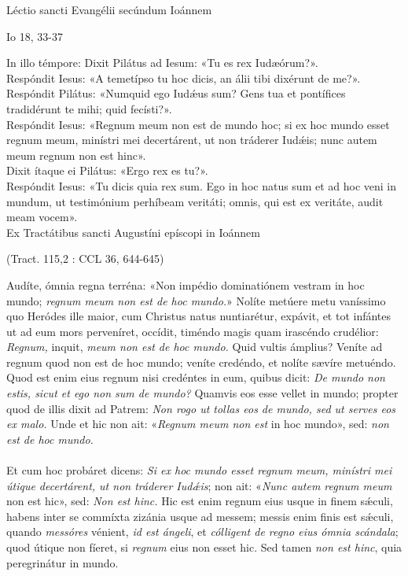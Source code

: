 \documentclass[options]{article}
\begin{document}
			Léctio sancti Evangélii secúndum Ioánnem 
		\begin{flushright}
			Io 18, 33-37 
		\end{flushright} 
	In illo témpore:
	Dixit Pilátus ad Iesum: «Tu es rex Iudæórum?».\\
	Respóndit Iesus: «A temetípso tu hoc dicis, an álii tibi dixérunt de me?».\\
	Respóndit Pilátus: «Numquid ego Iud\'{æ}us sum? Gens tua et pontífices tradidérunt te mihi; quid fecísti?».\\
	Respóndit Iesus: «Regnum meum non est de mundo hoc; si ex hoc mundo esset regnum meum, minístri mei decertárent, ut non tráderer Iud\'{æ}is; nunc autem meum regnum non est hinc».\\
	Dixit ítaque ei Pilátus: «Ergo rex es tu?».\\
	Respóndit Iesus: «Tu dicis quia rex sum. Ego in hoc natus sum et ad hoc veni in mundum, ut testimónium perhíbeam veritáti; omnis, qui est ex veritáte, audit meam vocem».\\
	
	Ex Tractátibus sancti Augustíni epíscopi in Ioánnem 
	\begin{flushright}
		(Tract. 115,2 : CCL 36, 644-645)
	\end{flushright}
	
	Audíte, ómnia regna terréna: «Non impédio dominatiónem vestram in hoc mundo; \emph{regnum meum non est de hoc mundo.}» Nolíte metúere metu vaníssimo quo Heródes ille maior, cum Christus natus nuntiarétur, expávit, et tot infántes ut ad eum mors perveníret, occídit, timéndo magis quam irascéndo crudélior: \emph{Regnum,} inquit, \emph{meum non est de hoc mundo.} Quid vultis ámplius? Veníte ad regnum quod non est de hoc mundo; veníte credéndo, et nolíte sævíre metuéndo.\\
	
	Quod est enim eius regnum nisi credéntes in eum, quibus dicit: \emph{De mundo non estis, sicut et ego non sum de mundo?} Quamvis eos esse vellet in mundo; propter quod de illis dixit ad Patrem: \emph{Non rogo ut tollas eos de mundo, sed ut serves eos ex malo.} Unde et hic non ait: «\emph{Regnum meum non est} in hoc mundo», sed: \emph{non est de hoc mundo.}\\
	\\
	Et cum hoc probáret dicens: \emph{Si ex hoc mundo esset regnum meum, minístri mei útique decertárent, ut non tráderer Iud\'{æ}is}; non ait: «\emph{Nunc autem regnum meum}  non est hic», sed: \emph{Non est hinc.} Hic est enim regnum eius usque in finem s\'{æ}culi, habens inter se commíxta zizánia usque ad messem; messis enim finis est s\'{æ}culi, quando \emph{messóres} vénient, \emph{id est ángeli}, et \emph{cólligent de regno eius ómnia scándala}; quod útique non fíeret, si \emph{regnum} eius non esset hic. Sed tamen \emph{non est hinc}, quia peregrinátur in mundo.\\
	
\end{document}
